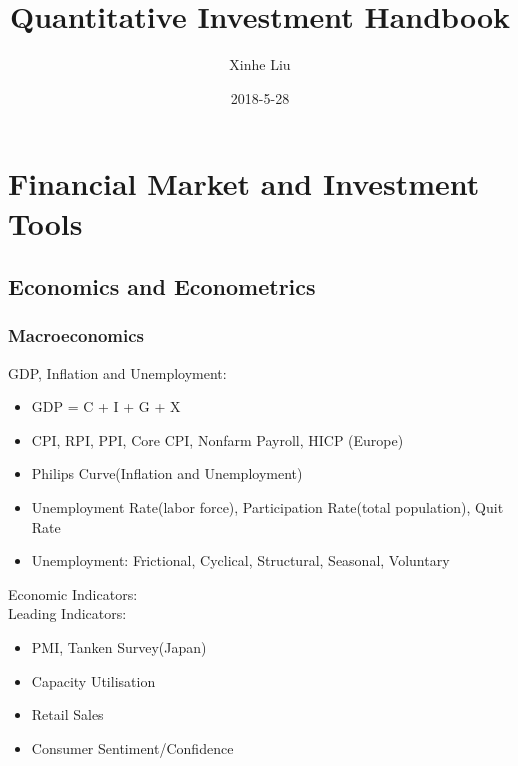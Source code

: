 \documentclass[11pt, openany]{book}              %
\title{\bf Quantitative Investment Handbook}    %
\author{Xinhe Liu}              %
\date{2018-5-28}                           %
\begin{document}
\maketitle                              %
\tableofcontents                        %
\mainmatter                             %

\part{Financial Market and Investment Tools}

\chapter{Economics and Econometrics}

\section{Macroeconomics} 

GDP, Inflation and Unemployment:

\begin{itemize}
    \item GDP = C + I + G + X 
    \item CPI, RPI, PPI, Core CPI, Nonfarm Payroll, HICP (Europe)
    \item Philips Curve(Inflation and Unemployment)
    \item Unemployment Rate(labor force), Participation Rate(total population), Quit Rate 
    \item Unemployment: Frictional, Cyclical, Structural, Seasonal, Voluntary 
\end{itemize}

Economic Indicators: \\

Leading Indicators: 

\begin{itemize}
    \item PMI, Tanken Survey(Japan)
    \item Capacity Utilisation 
    \item Retail Sales
    \item Consumer Sentiment/Confidence 
\end{itemize}
\end{document}
